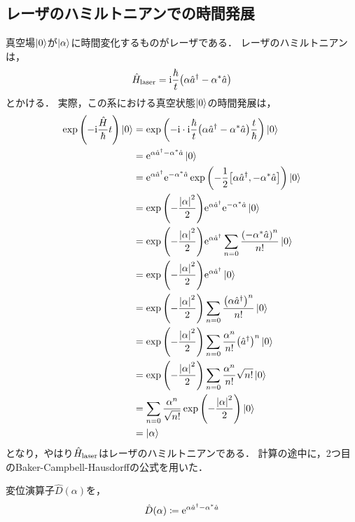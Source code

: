 \documentclass{report}
\begin{document}
  \subsection{レーザのハミルトニアンでの時間発展}
    真空場$\ket{0}$が$\ket{\alpha}$に時間変化するものがレーザである．
    レーザのハミルトニアンは，
    \begin{align}
      \hat{H}_{\mathrm{laser}} = \mathrm{i}\frac{\hbar}{t}\qty(\alpha\hat{a}^{\dag} - \alpha^*\hat{a})
    \end{align}
    とかける．
    実際，この系における真空状態$\ket{0}$の時間発展は，
    \begin{align}
      \exp\qty(-\mathrm{i}\frac{\hat{H}}{\hbar}t)\ket{0} &= \exp\qty(-\mathrm{i}\cdot\mathrm{i}\frac{\hbar}{t}\qty(\alpha\hat{a}^{\dag} - \alpha^*\hat{a})\frac{t}{\hbar})\ket{0} \\ 
      &= \mathrm{e}^{\alpha\hat{a}^{\dag} - \alpha^*\hat{a}}\ket{0} \\ 
      &= \mathrm{e}^{\alpha\hat{a}^{\dag}}\mathrm{e}^{-\alpha^*\hat{a}}\exp\qty(-\frac{1}{2}\qty[\alpha\hat{a}^{\dag}, -\alpha^*\hat{a}])\ket{0} \\ 
      &= \exp\qty(-\frac{\abs{\alpha}^2}{2})\mathrm{e}^{\alpha\hat{a}^{\dag}}\mathrm{e}^{-\alpha^*\hat{a}}\ket{0} \\ 
      &= \exp\qty(-\frac{\abs{\alpha}^2}{2})\mathrm{e}^{\alpha\hat{a}^{\dag}}\sum_{n = 0}\frac{\qty(-\alpha^*\hat{a})^n}{n!}\ket{0} \\ 
      &= \exp\qty(-\frac{\abs{\alpha}^2}{2})\mathrm{e}^{\alpha\hat{a}^{\dag}}\ket{0} \\ 
      &= \exp\qty(-\frac{\abs{\alpha}^2}{2})\sum_{n = 0}\frac{\qty(\alpha\hat{a}^{\dag})^n}{n!}\ket{0} \\ 
      &= \exp\qty(-\frac{\abs{\alpha}^2}{2})\sum_{n = 0}\frac{\alpha^n}{n!}\qty(\hat{a}^{\dag})^n\ket{0} \\ 
      &= \exp\qty(-\frac{\abs{\alpha}^2}{2})\sum_{n = 0}\frac{\alpha^n}{n!}\sqrt{n!}\ket{0} \\ 
      &= \sum_{n = 0}\frac{\alpha^n}{\sqrt{n!}}\exp\qty(-\frac{\abs{\alpha}^2}{2})\ket{0} \\ 
      &= \ket{\alpha}
    \end{align}
    となり，やはり$\hat{H}_{\mathrm{laser}}$はレーザのハミルトニアンである．
    計算の途中に，2つ目のBaker-Campbell-Hausdorffの公式を用いた．
    \par
    変位演算子$\hat{D}(\alpha)$を，
    \begin{align}
      \hat{D}(\alpha) \coloneqq \mathrm{e}^{\alpha\hat{a}^{\dag} - \alpha^*\hat{a}}
    \end{align}
\end{document}
